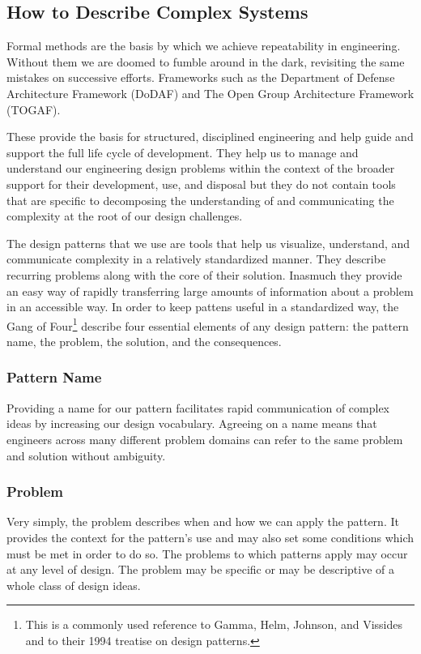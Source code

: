 \documentclass[jou,apacite]{apa6}
\begin{document}
\subsection{How to Describe Complex Systems}  %
Formal methods are the basis by which we achieve repeatability in engineering.  Without them we are doomed to fumble around in the dark, revisiting the same mistakes on successive efforts.  Frameworks such as the Department of Defense Architecture Framework (DoDAF) and The Open Group Architecture Framework (TOGAF).  

These provide the basis for structured, disciplined engineering and help guide and support the full life cycle of development.  They help us to manage and understand our engineering design problems within the context of the broader support for their development, use, and disposal but they do not contain tools that are specific to decomposing the understanding of and communicating the complexity at the root of our design challenges.

The design patterns that we use are tools that help us visualize, understand, and communicate complexity in a relatively standardized manner.  They describe recurring problems along with the core of their solution.  Inasmuch they provide an easy way of rapidly transferring large amounts of information about a problem in an accessible way.  In order to keep pattens useful in a standardized way, the Gang of Four\footnote{This is a commonly used reference to Gamma, Helm, Johnson, and Vissides and to their 1994 treatise on design patterns.} describe four essential elements of any design pattern: the pattern name, the problem, the solution, and the consequences.~\cite[page 3]{Gamma}

\subsubsection{Pattern Name}
Providing a name for our pattern facilitates rapid communication of complex ideas by increasing our design vocabulary.  Agreeing on a name means that engineers across many different problem domains can refer to the same problem and solution without ambiguity.

\subsubsection{Problem}
Very simply, the problem describes when and how we can apply the pattern.  It provides the context for the pattern's use and may also set some conditions which must be met in order to do so.  The problems to which patterns apply may occur at any level of design.  The problem may be specific or may be descriptive of a whole class of design ideas.
\end{document}
